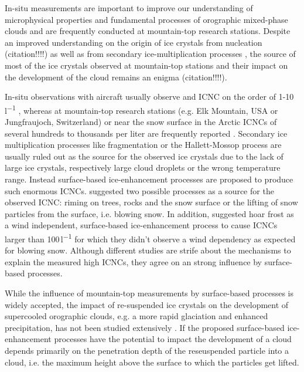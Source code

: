 \documentclass[draft,linenumbers]{agujournal}
\begin{document}
In-situ measurements are important to improve our understanding of microphysical properties and fundamental processes of orographic mixed-phase clouds \citep{Bau10} and are frequently conducted at mountain-top research stations. Despite an improved understanding on the origin of ice crystals from nucleation (citation!!!!) as well as from secondary ice-multiplication processes \citep{Fie17}, the source of most of the ice crystals observed at mountain-top stations and their impact on the development of the cloud remains an enigma (citation!!!!).
 
In-situ observations with aircraft usually observe and ICNC on the order of 1-10\,\si{l^{-1}} \citep{Gul01}, whereas at mountain-top research stations (e.g. Elk Mountain, USA or Jungfraujoch, Switzerland) or near the snow surface in the Arctic ICNCs of several hundreds to thousands per liter are frequently reported \citep{Rog87, Lac01, Loy15}. Secondary ice multiplication processes like fragmentation \citep{Ran01} or the Hallett-Mossop process \citep{Hal74} are usually ruled out as the source for the observed ice crystals due to the lack of large ice crystals, respectively large cloud droplets or the wrong temperature range. Instead surface-based ice-enhancement processes are proposed to produce such enormous ICNCs. \citet{Rog87} suggested two possible processes as a source for the observed ICNC: riming on trees, rocks and the snow surface or the lifting of snow particles from the surface, i.e. blowing snow. In addition, \citet{Loy15} suggested hoar frost as a wind independent, surface-based ice-enhancement process to cause ICNCs larger than 100\,\si{l^{-1}} for which they didn't observe a wind dependency as expected for blowing snow. Although different studies are strife about the mechanisms to explain the measured high ICNCs, they agree on an strong influence by surface-based processes. 

While the influence of mountain-top measurements by surface-based processes is widely accepted, the impact of re-suspended ice crystals on the development of supercooled orographic clouds, e.g. a more rapid glaciation and enhanced precipitation, has not been studied extensively \citep{Gee15}. If the proposed surface-based ice-enhancement processes have the potential to impact the development of a cloud depends primarily on the penetration depth of the reseuspended particle into a cloud, i.e. the maximum height above the surface to which the particles get lifted.   
\end{document}
